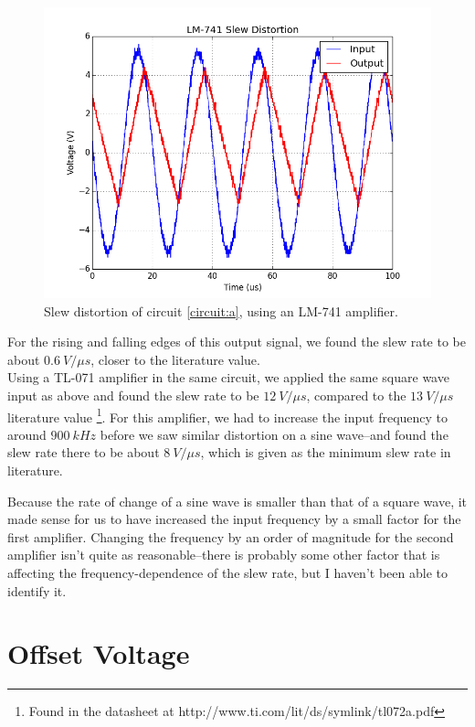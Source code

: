 \documentclass[11pt]{article}
\begin{document}
\begin{figure}[H]
    \centering
    \includegraphics[scale=0.6]{Plots/figA-2.png}
    \caption{Slew distortion of circuit \ref{circuit:a}, using an LM-741 amplifier.}
    \label{fig:A-2}
\end{figure}

For the rising and falling edges of this output signal, we found the slew rate to be about $0.6\ V / \mu s$, closer to the literature value.\\

Using a TL-071 amplifier in the same circuit, we applied the same square wave input as above and found the slew rate to be $12\ V / \mu s$, compared to the $13\ V / \mu s$ literature value \footnote{Found in the datasheet at http://www.ti.com/lit/ds/symlink/tl072a.pdf}. For this amplifier, we had to increase the input frequency to around $900\ kHz$ before we saw similar distortion on a sine wave--and found the slew rate there to be about $8\ V / \mu s$, which is given as the minimum slew rate in literature.

Because the rate of change of a sine wave is smaller than that of a square wave, it made sense for us to have increased the input frequency by a small factor for the first amplifier. Changing the frequency by an order of magnitude for the second amplifier isn't quite as reasonable--there is probably some other factor that is affecting the frequency-dependence of the slew rate, but I haven't been able to identify it.


\section{Offset Voltage}
\end{document}
